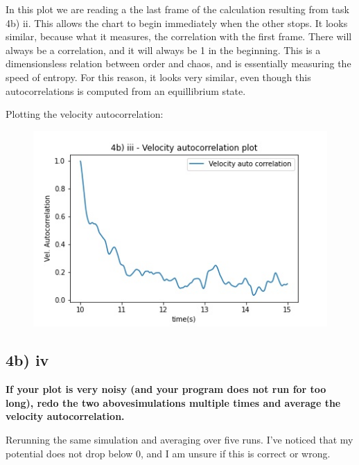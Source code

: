 \documentclass[a4paper,10pt,english]{article}
\begin{document}
In this plot we are reading a the last frame of the calculation resulting from task 4b) ii. This allows the chart to begin immediately when the other stops. It looks similar, because what it measures, the correlation with the first frame. There will always be a correlation, and it will always be 1 in the beginning. This is a dimensionsless relation between order and chaos, and is essentially measuring the speed of entropy. For this reason, it looks very similar, even though this autocorrelations is computed from an equillibrium state. 

Plotting the velocity autocorrelation:

\begin{figure}[h!]
        \centering 
        \includegraphics[scale=0.6]{./py/4b_iii.jpg} 
        \caption{ }
        \label{fig:4biii}
\end{figure}


\newpage
\subsection*{4b) iv}
\textbf{If your plot is very noisy (and your program does not run for too long), redo the two abovesimulations multiple times and average the velocity autocorrelation.}

Rerunning the same simulation and averaging over five runs. I've noticed that my potential does not drop below 0, and I am unsure if this is correct or wrong.
\end{document}
